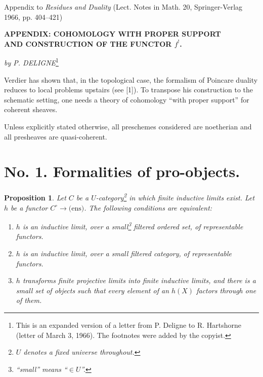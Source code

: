 \documentclass[12pt]{amsart}
\theoremstyle{plain}
\newtheorem{prop}{Proposition}
\theoremstyle{definition}
\begin{document}
\begin{center}
Appendix to \textit{Residues and Duality} (Lect. Notes in Math. 20, Springer-Verlag 1966, pp. 404--421)
\end{center}

\bigskip

\begin{center}
\textbf{APPENDIX: COHOMOLOGY WITH PROPER SUPPORT}\\[4pt]
\textbf{AND CONSTRUCTION OF THE FUNCTOR $f^{!}$.}
\end{center}

\medskip

\begin{center}
\textit{by P. DELIGNE}\footnote{This is an expanded version of a letter from P. Deligne to R. Hartshorne (letter of March 3, 1966). The footnotes were added by the copyist.}
\end{center}

\bigskip

Verdier has shown that, in the topological case, the formalism of Poincare duality reduces to local problems upstairs (see [1]). To transpose his construction to the schematic setting, one needs a theory of cohomology ``with proper support'' for coherent sheaves.

Unless explicitly stated otherwise, all preschemes considered are noetherian and all presheaves are quasi-coherent.

\section*{No. 1. Formalities of pro-objects.}

\begin{prop}
Let $C$ be a $U$-category\footnote{$U$ denotes a fixed universe throughout.} in which finite inductive limits exist.
Let $h$ be a functor $C^{\circ}\to\text{(ens)}$. The following conditions are equivalent:
\begin{enumerate}
\item[(i)] $h$ is an inductive limit, over a small\footnote{``small'' means ``$\in U$''.} filtered ordered set, of representable functors.
\item[(ii)] $h$ is an inductive limit, over a small filtered category, of representable functors.
\item[(iii)] $h$ transforms finite projective limits into finite inductive limits, and there is a small set of objects such that every element of an $h(X)$ factors through one of them.
\end{enumerate}
\end{prop}
\end{document}
